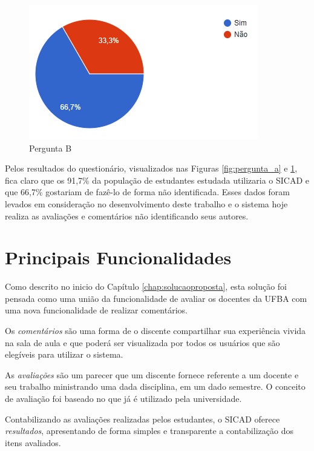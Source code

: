 \documentclass[12pt, a4paper]{report}
\begin{document}
\begin{figure}
\centering
\includegraphics[scale=0.8]{pergunta_b}
\caption{Pergunta B}
\label{fig:pergunta_b}
\end{figure}



Pelos resultados do questionário, visualizados nas Figuras \ref{fig:pergunta_a} e \ref{fig:pergunta_b}, fica claro que os 91,7\% da população de estudantes estudada utilizaria o SICAD e que 66,7\% gostariam de fazê-lo de forma não identificada. Esses dados foram levados em consideração no desenvolvimento deste trabalho e o sistema hoje realiza as avaliações e comentários não identificando seus autores.


\section{ Principais Funcionalidades}

Como descrito no inicio do Capítulo \ref{chap:solucaoproposta}, esta solução foi pensada como uma união da funcionalidade de avaliar os docentes da UFBA com uma nova funcionalidade de realizar comentários.

Os \textit{comentários} são uma forma de o discente compartilhar sua experiência vivida na sala de aula e que poderá ser visualizada por todos os usuários que são elegíveis para utilizar o sistema.

As \textit{avaliações} são um parecer que um discente fornece referente a um docente e seu trabalho ministrando uma dada disciplina, em um dado semestre. O conceito de avaliação foi baseado no que já é utilizado pela universidade.

Contabilizando as avaliações realizadas pelos estudantes, o \ac{SICAD} oferece \textit{resultados}, apresentando de forma simples e transparente a contabilização dos itens avaliados.
\end{document}
